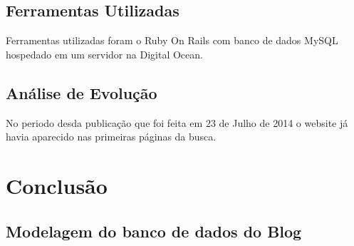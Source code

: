 \documentclass[
	12pt,				%
	openright,			%
	twoside,			%
	a4paper,			%
	english,			%
	french,				%
	spanish,			%
	brazil				%
	]{abntex2}
\begin{document}
\section{Ferramentas Utilizadas}

Ferramentas utilizadas foram o Ruby On Rails com banco de dados MySQL hospedado em um servidor na Digital Ocean.

\section{Análise de Evolução}

No periodo desda publicação que foi feita em 23 de Julho de 2014 o website já havia aparecido nas primeiras páginas da busca.



\chapter*[Conclusão]{Conclusão}


\postextual



%
%



\begin{anexosenv}

\partanexos

\chapter{Modelagem do banco de dados do Blog}


\end{anexosenv}

\printindex
\end{document}
